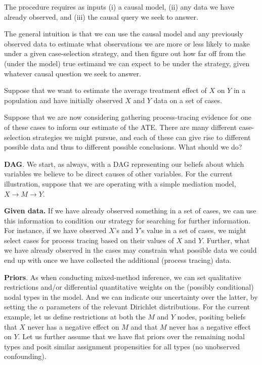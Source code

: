 \documentclass[12pt,]{book}
\begin{document}
The procedure requires as inputs (i) a causal model, (ii) any data we have already observed, and (iii) the causal query we seek to answer.

The general intuition is that we can use the causal model and any previously observed data to estimate what observations we are more or less likely to make under a given case-selection strategy, and then figure out how far off from the (under the model) true estimand we can expect to be under the strategy, given whatever causal question we seek to answer.

Suppose that we want to estimate the average treatment effect of \(X\) on \(Y\) in a population and have initially observed \(X\) and \(Y\) data on a set of cases.

Suppose that we are now considering gathering process-tracing evidence for one of these cases to inform our estimate of the ATE. There are many different case-selection strategies we might pursue, and each of these can give rise to different possible data and thus to different possible conclusions. What should we do?

\textbf{DAG}. We start, as always, with a DAG representing our beliefs about which variables we believe to be direct causes of other variables. For the current illustration, suppose that we are operating with a simple mediation model, \(X \rightarrow M \rightarrow Y\).

\textbf{Given data.} If we have already observed something in a set of cases, we can use this information to condition our strategy for searching for further information. For instance, if we have observed \(X\)'s and \(Y\)'s value in a set of cases, we might select cases for process tracing based on their values of \(X\) and \(Y\). Further, what we have already observed in the cases may constrain what possible data we could end up with once we have collected the additional (process tracing) data.

\textbf{Priors}. As when conducting mixed-method inference, we can set qualitative restrictions and/or differential quantitative weights on the (possibly conditional) nodal types in the model. And we can indicate our uncertainty over the latter, by setting the \(\alpha\) parameters of the relevant Dirichlet distributions. For the current example, let us define restrictions at both the \(M\) and \(Y\) nodes, positing beliefs that \(X\) never has a negative effect on \(M\) and that \(M\) never has a negative effect on \(Y\). Let us further assume that we have flat priors over the remaining nodal types and posit similar assignment propensities for all types (no unobserved confounding).
\end{document}
